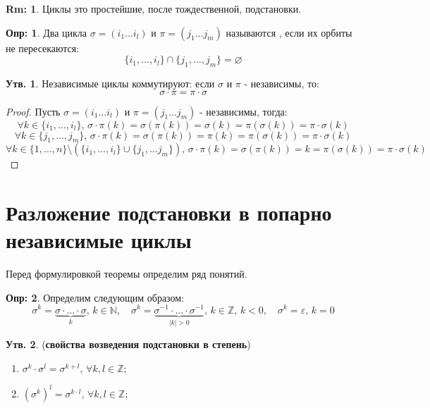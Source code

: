 \documentclass[12pt]{article}
\newcommand{\MN}{\mathbb{N}}
\newcommand{\MZ}{\mathbb{Z}}
\newcommand{\VN}{\varnothing}
\newcommand{\VE}{\varepsilon}
\theoremstyle{definition}
\newtheorem{defn}{Опр:}
\newtheorem{rem}{Rm:}
\newtheorem{prop}{Утв.}
\begin{document}
\begin{rem}
	Циклы это простейшие, после тождественной, подстановки.
\end{rem}
\begin{defn}
	Два цикла $\sigma = (i_1\dotsc i_l)$ и $\pi = (j_1 \dotsc j_m)$ называются , если их орбиты не пересекаются:
	$$
		\{i_1, \dotsc, i_l\} \cap \{j_1, \dotsc, j_m\} = \VN
	$$
\end{defn}
\begin{prop}
	Независимые циклы коммутируют: если $\sigma$ и $\pi$ - независимы, то:
	$$
		\sigma{\cdot}\pi = \pi{\cdot}\sigma
	$$
\end{prop}
\begin{proof}
	Пусть $\sigma = (i_1\dotsc i_l)$ и $\pi = (j_1 \dotsc j_m)$ - независимы, тогда:
	$$
		\forall k \in \{i_1, \dotsc, i_l\}, \, \sigma{\cdot}\pi(k)= \sigma(\pi(k)) = \sigma(k) = \pi(\sigma(k)) = \pi{\cdot}\sigma(k)
	$$
	$$
		\forall k \in \{j_1, \dotsc, j_m\}, \, \sigma{\cdot}\pi(k) = \sigma(\pi(k)) = \pi(k) = \pi(\sigma(k)) = \pi{\cdot}\sigma(k)
	$$
	$$
		\forall k \in  \{1, \dotsc, n\} \setminus \left(\{i_1,\dotsc, i_l\} \cup \{j_1, \dotsc j_m\}\right) , \, \sigma{\cdot}\pi(k) = \sigma(\pi(k)) =  k = \pi(\sigma(k)) =\pi{\cdot}\sigma(k)
	$$
\end{proof}
\newpage
\section*{Разложение подстановки в попарно независимые циклы}
Перед формулировкой теоремы определим ряд понятий.
\begin{defn}
	Определим  следующим образом:
	$$
		\sigma^k = \underbrace{\sigma{\cdot}\dotsc{\cdot}\sigma}_{k}, \, k \in \MN, \quad \sigma^k =\underbrace{\sigma^{-1}{\cdot}\dotsc{\cdot}\sigma^{-1}}_{|k| > 0}, \, k \in \MZ, \, k < 0, \quad \sigma^k = \VE, \, k = 0
	$$
\end{defn}

\begin{prop}(\textbf{свойства возведения подстановки в степень})
	\begin{enumerate}[label=(\arabic*)]
		\item $\sigma^k{\cdot}\sigma^l = \sigma^{k + l}, \, \forall k,l \in \MZ$;
		\item $(\sigma^k)^l = \sigma^{k{\cdot}l}, \, \forall k,l \in \MZ$;
	\end{enumerate}
\end{prop}
\end{document}
